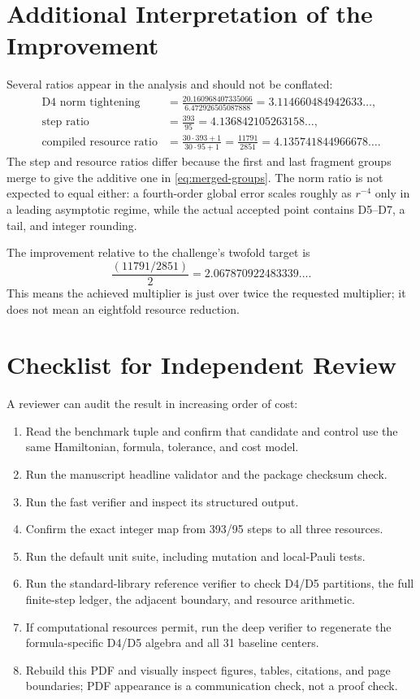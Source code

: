 \section{Additional Interpretation of the Improvement}
\label{app:interpretation}

Several ratios appear in the analysis and should not be conflated:
\begin{align}
\text{D4 norm tightening}
  &=\frac{20.160968407335066}{6.472926505087888}
    =3.114660484942633\ldots,\\
\text{step ratio}
  &=\frac{393}{95}=4.136842105263158\ldots,\\
\text{compiled resource ratio}
  &=\frac{30\cdot393+1}{30\cdot95+1}
    =\frac{11791}{2851}
    =4.135741844966678\ldots.
\end{align}
The step and resource ratios differ because the first and last fragment groups
merge to give the additive one in \cref{eq:merged-groups}.  The norm ratio is
not expected to equal either: a fourth-order global error scales roughly as
$r^{-4}$ only in a leading asymptotic regime, while the actual accepted point
contains D5--D7, a tail, and integer rounding.

The improvement relative to the challenge's twofold target is
\begin{equation}
 \frac{(11791/2851)}{2}=2.067870922483339\ldots.
\end{equation}
This means the achieved multiplier is just over twice the requested
multiplier; it does not mean an eightfold resource reduction.

\section{Checklist for Independent Review}
\label{app:checklist}

A reviewer can audit the result in increasing order of cost:
\begin{enumerate}
\item Read the benchmark tuple and confirm that candidate and control use the
same Hamiltonian, formula, tolerance, and cost model.
\item Run the manuscript headline validator and the package checksum check.
\item Run the fast verifier and inspect its structured output.
\item Confirm the exact integer map from 393/95 steps to all three resources.
\item Run the default unit suite, including mutation and local-Pauli tests.
\item Run the standard-library reference verifier to check D4/D5 partitions,
the full finite-step ledger, the adjacent boundary, and resource arithmetic.
\item If computational resources permit, run the deep verifier to regenerate
the formula-specific D4/D5 algebra and all 31 baseline centers.
\item Rebuild this PDF and visually inspect figures, tables, citations, and
page boundaries; PDF appearance is a communication check, not a proof check.
\end{enumerate}
